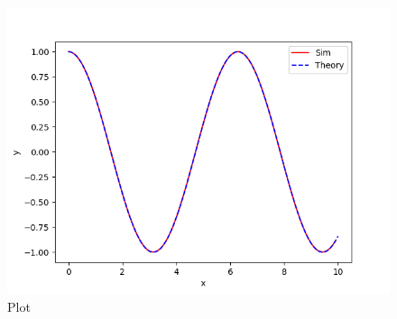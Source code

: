 \documentclass[journal]{IEEEtran}
\begin{document}
\begin{figure}[htbp] %
    \centering
    \includegraphics[width=\textwidth]{figs/plot.png} %
    \caption{Plot}
\end{figure}
\end{document}
